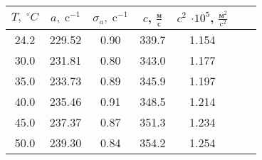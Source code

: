 \begin{tabular}{ccccccc}
\toprule
$T, \;^{\circ} C$ & $a, \; \text{c}^{-1}$ & $\sigma_a, \; \text{c}^{-1}$ & $c$, $\frac{\text{м}}{\text{с}}$ & $c^{2}$ $\cdot 10^5$, $\frac{\text{м}^{2}}{\text{c}^{2}}$\\
\midrule
24.2 & 229.52 & 0.90 & 339.7 & 1.154  \\
30.0 & 231.81 & 0.80 & 343.0 & 1.177  \\
35.0 & 233.73 & 0.89 & 345.9 & 1.197  \\
40.0 & 235.46 & 0.91 & 348.5 & 1.214  \\
45.0 & 237.37 & 0.87 & 351.3 & 1.234  \\
50.0 & 239.30 & 0.84 & 354.2 & 1.254  \\
\bottomrule
\end{tabular}